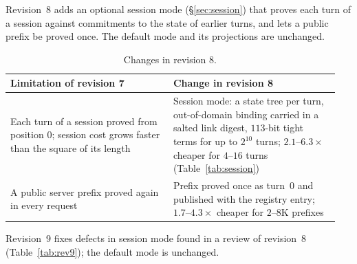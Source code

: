\documentclass[11pt]{article}
\begin{document}
Revision~8 adds an optional session mode (\S\ref{sec:session}) that proves each turn of a session against commitments to the state of earlier turns, and lets a public prefix be proved once.
The default mode and its projections are unchanged.

\begin{table}[h]
\centering\small
\begin{tabular}{@{}p{0.47\linewidth}p{0.48\linewidth}@{}}
\toprule
Limitation of revision 7 & Change in revision 8 \\
\midrule
Each turn of a session proved from position \(0\); session cost grows faster than the square of its length & Session mode: a state tree per turn, out-of-domain binding carried in a salted link digest, \(113\)-bit tight terms for up to \(2^{10}\) turns; \(2.1\)--\(6.3\times\) cheaper for \(4\)--\(16\) turns (Table~\ref{tab:session}) \\
A public server prefix proved again in every request & Prefix proved once as turn~\(0\) and published with the registry entry; \(1.7\)--\(4.3\times\) cheaper for \(2\)--\(8\)K prefixes \\
\bottomrule
\end{tabular}
\caption{Changes in revision 8.}
\label{tab:rev8}
\end{table}

Revision~9 fixes defects in session mode found in a review of revision~8 (Table~\ref{tab:rev9}); the default mode is unchanged.
\end{document}
